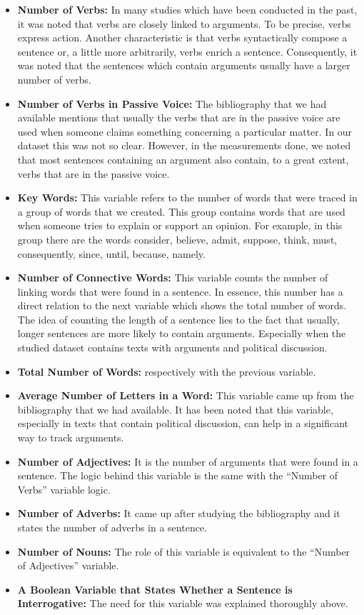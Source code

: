 \begin{itemize}

	\item \textbf{Number of Verbs:} In many studies which have been conducted in the past, it was noted that verbs are closely linked to arguments. To be precise, verbs express action. Another characteristic is that verbs syntactically compose a sentence or, a little more arbitrarily, verbs enrich a sentence. Consequently, it was noted that the sentences which contain arguments usually have a larger number of verbs.
	\item \textbf{Number of Verbs in Passive Voice:} The bibliography that we had available mentions that usually the verbs that are in the passive voice are used when someone claims something concerning a particular matter. In our dataset this was not so clear. However, in the measurements done, we noted that most sentences containing an argument also contain, to a great extent, verbs that are in the passive voice.
	\item \textbf{Key Words:} This variable refers to the number of words that were traced in a group of words that we created. This group contains words that are used when someone tries to explain or support an opinion. For example, in this group there are the words  consider, believe, admit, suppose, think, must, consequently, since, until, because, namely.
	\item \textbf{Number of Connective Words:} This variable counts the number of linking words that were found in a sentence. In essence, this number has a direct relation to the next variable which shows the total number of words. The idea of counting the length of a sentence lies to the fact that usually, longer sentences are more likely to contain arguments. Especially when the studied dataset contains texts with arguments and political discussion.
	\item \textbf{Total Number of Words:} respectively with the previous variable.
	\item \textbf{Average Number of Letters in a Word:} This variable came up from the bibliography that we had available. It has been noted that this variable, especially in texts that contain political discussion, can help in a significant way to track arguments.
	\item \textbf{Number of Adjectives:} It is the number of arguments that were found in a sentence. The logic behind this variable is the same  with  the ``Number of Verbs'' variable logic.
	\item \textbf{Number of Adverbs:} It came up after studying the bibliography and it states the number of adverbs in a sentence.
	\item \textbf{Number of Nouns:} The role of this variable is equivalent to the ``Number of Adjectives'' variable.
	\item \textbf{A Boolean Variable that States Whether a Sentence is Interrogative:} The need for this variable was explained thoroughly above.

\end{itemize}

